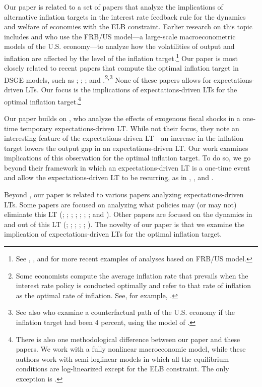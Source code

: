 \documentclass[11pt]{article}
\begin{document}
	Our paper is related to a set of papers that analyze the implications of alternative inflation targets in the interest rate feedback rule for the dynamics and welfare of economies with the ELB constraint. Earlier research on this topic includes \citet{ReifschneiderWilliams2000} and \citet{CoenenOrphanidesWieland2004} who use the FRB/US model---a large-scale macroeconometric models of the U.S. economy---to analyze how the volatilities of output and inflation are affected by the level of the inflation target.\footnote{See \citet{Williams2009}, \citet{Tulip2014}, and \citet{KileyRoberts2017} for more recent examples of analyses based on FRB/US model.} Our paper is most closely related to recent papers that compute the optimal inflation target in DSGE models, such as \citet{CoibionGorodnichenkoWieland2012}; \citet{Blanco2018}; \citet{CarrerasCoibionGorodnichenkoWieland2016}; and \citet{AndradeGaliLeBihanMatheron2018}.\footnote{Some economists compute the average inflation rate that prevails when the interest rate policy is conducted optimally and refer to that rate of inflation as the optimal rate of inflation. See, for example, \citet{Billi2011}.}$^{,}$\footnote{See also \citet{AruobaSchorfheide2015} who examine a counterfactual path of the U.S. economy if the inflation target had been 4 percent, using the model of \citet{AruobaCubaBordaSchorfheide2018}.} None of these papers allows for expectations-driven LTs. Our focus is the implications of expectations-driven LTs for the optimal inflation target.\footnote{There is also one methodological difference between our paper and these papers. We work with a fully nonlinear macroeconomic model, while these authors work with semi-loglinear models in which all the equilibrium conditions are log-linearized except for the ELB constraint. The only exception is \citet{Blanco2018}.} 
	
	Our paper builds on \citet{MertensRavn2014}, who analyze the effects of exogenous fiscal shocks in a one-time temporary expectations-driven LT. While not their focus, they note an interesting feature of the expectations-driven LT---an increase in the inflation target lowers the output gap in an expectations-driven LT. Our work examines implications of this observation for the optimal inflation target. To do so, we go beyond their framework in which an expectations-driven LT is a one-time event and allow the expectations-driven LT to be recurring, as in \citet{AruobaCubaBordaSchorfheide2018}, \citet{NakataSchmidt2019}, and \citet{Tamanyu2019}.
	
	Beyond \citet{MertensRavn2014}, our paper is related to various papers analyzing expectations-driven LTs. Some papers are focused on analyzing what policies may (or may not) eliminate this LT (\citet{AlstadheimHenderson2006}; \citet{Armenter2017}; \citet{BenhabibSchmittGroheUribe2002}; \citet{Schmidt2016}; \citet{SchmittGroheUribe2014}; \citet{SugoUeda2014}; \citet{NakataSchmidt2019}; and \citet{Tamanyu2019}). Other papers are focused on the dynamics in and out of this LT (\citet{AruobaCubaBordaSchorfheide2018}; \citet{Bilbiie2018}; \citet{CubaBordaSingh2018}; \citet{Hirose2007}; \citet{HiroseForthcoming}; \citet{SchmittGroheUribe2017}). The novelty of our paper is that we examine the implication of expectations-driven LTs for the optimal inflation target. 
	
\end{document}
